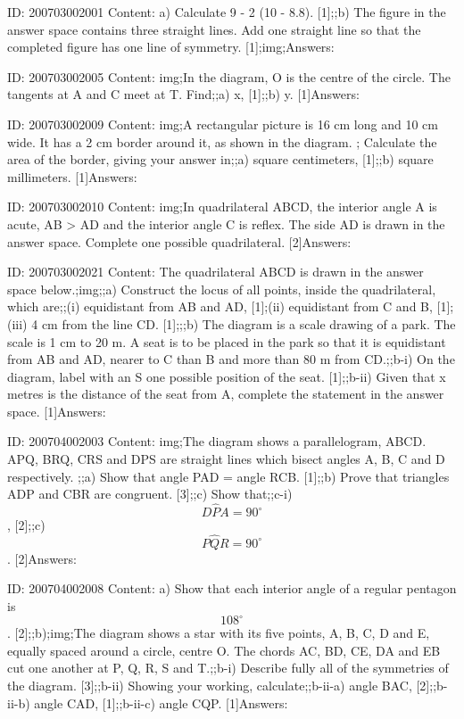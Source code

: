 \documentclass{article}
\begin{document}
ID: 200703002001
Content:
a) Calculate 9 - 2 (10 - 8.8). [1];;b) The figure in the answer space contains three straight lines. Add one straight line so that the completed figure has one line of symmetry. [1];img;Answers:

ID: 200703002005
Content:
img;In the diagram, O is the centre of the circle. The tangents at A and C meet at T. Find;;a) x, [1];;b) y. [1]Answers:

ID: 200703002009
Content:
img;A rectangular picture is 16 cm long and 10 cm wide. It has a 2 cm border around it, as shown in the diagram. ; Calculate the area of the border, giving your answer in;;a) square centimeters, [1];;b) square millimeters. [1]Answers:

ID: 200703002010
Content:
img;In quadrilateral ABCD, the interior angle A is acute, AB > AD and the interior angle C is reflex. The side AD is drawn in the answer space. Complete one possible quadrilateral. [2]Answers:

ID: 200703002021
Content:
The quadrilateral ABCD is drawn in the answer space below.;img;;a) Construct the locus of all points, inside the quadrilateral, which are;;(i)	equidistant from AB and AD, [1];(ii) equidistant from C and B, [1];(iii) 4 cm from the line CD. [1];;;b) The diagram is a scale drawing of a park. The scale is 1 cm to 20 m. A seat is to be placed in the park so that it is equidistant from AB and AD, nearer to C than B and more than 80 m from CD.;;b-i) On the diagram, label with an S one possible position of the seat. [1];;b-ii) Given that x metres is the distance of the seat from A, complete the statement in the answer space. [1]Answers:

ID: 200704002003
Content:
img;The diagram shows a parallelogram, ABCD. APQ, BRQ, CRS and DPS are straight lines which bisect angles A, B, C and D respectively. ;;a) Show that angle PAD = angle RCB. [1];;b) Prove that triangles ADP and CBR are congruent. [3];;c) Show that;;c-i) $$D \hat P A = 90^{\circ}$$, [2];;c) $$P \hat Q R=90^{\circ}$$. [2]Answers:

ID: 200704002008
Content:
a) Show that each interior angle of a regular pentagon is $$108^{\circ}$$. [2];;b);img;The diagram shows a star with its five points, A, B, C, D and E, equally spaced around	a circle, centre O. The chords AC, BD, CE, DA and EB cut one another at P, Q, R, S and T.;;b-i) Describe fully all of the symmetries of the diagram. [3];;b-ii) Showing your working, calculate;;b-ii-a) angle BAC, [2];;b-ii-b) angle CAD, [1];;b-ii-c) angle CQP. [1]Answers:
\end{document}

